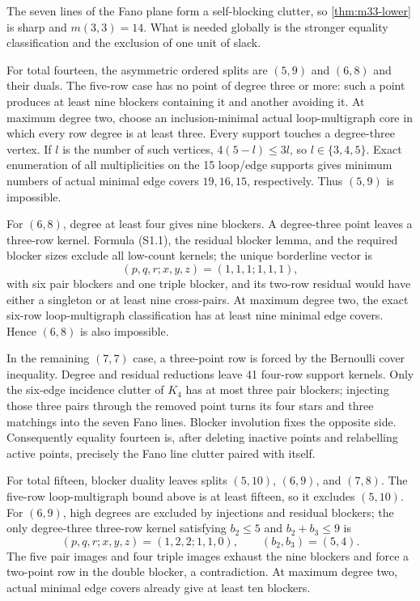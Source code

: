 \documentclass[11pt,a4paper]{article}
\theoremstyle{definition}
\begin{document}
The seven lines of the Fano plane form a self-blocking clutter, so
\cref{thm:m33-lower} is sharp and $m(3,3)=14$.  What is needed globally is
the stronger equality classification and the exclusion of one unit of
slack.

For total fourteen, the asymmetric ordered splits are
$(5,9)$ and $(6,8)$ and their duals.  The five-row case has no point of degree
three or more: such a point produces at least nine blockers containing it
and another avoiding it.  At maximum degree two, choose an inclusion-minimal
actual loop-multigraph core in which every row degree is at least three.
Every support touches a degree-three vertex.  If $l$ is the number of such
vertices, $4(5-l)\leq3l$, so $l\in\{3,4,5\}$.  Exact enumeration of all
multiplicities on the 15 loop/edge supports gives minimum numbers of actual
minimal edge covers $19,16,15$, respectively.  Thus $(5,9)$ is impossible.

For $(6,8)$, degree at least four gives nine blockers.  A degree-three point
leaves a three-row kernel.  Formula (S1.1), the residual blocker lemma, and
the required blocker sizes exclude all low-count kernels; the unique
borderline vector is
\[
 (p,q,r;x,y,z)=(1,1,1;1,1,1),
\]
with six pair blockers and one triple blocker, and its two-row residual would
have either a singleton or at least nine cross-pairs.  At maximum degree two,
the exact six-row loop-multigraph classification has at least nine minimal
edge covers.  Hence $(6,8)$ is also impossible.

In the remaining $(7,7)$ case, a three-point row is forced by the Bernoulli
cover inequality.  Degree and residual reductions leave 41 four-row support
kernels.  Only the six-edge incidence clutter of $K_4$ has at most three
pair blockers; injecting those three pairs through the removed point turns
its four stars and three matchings into the seven Fano lines.  Blocker
involution fixes the opposite side.  Consequently equality fourteen is,
after deleting inactive points and relabelling active points, precisely the
Fano line clutter paired with itself.

For total fifteen, blocker duality leaves splits $(5,10)$, $(6,9)$, and
$(7,8)$.  The five-row loop-multigraph bound above is at least fifteen, so it
excludes $(5,10)$.  For $(6,9)$, high degrees are excluded by injections and
residual blockers; the only degree-three three-row kernel satisfying
$b_2\leq5$ and $b_2+b_3\leq9$ is
\[
 (p,q,r;x,y,z)=(1,2,2;1,1,0),\qquad(b_2,b_3)=(5,4).
\]
The five pair images and four triple images exhaust the nine blockers and
force a two-point row in the double blocker, a contradiction.  At maximum
degree two, actual minimal edge covers already give at least ten blockers.
\end{document}
